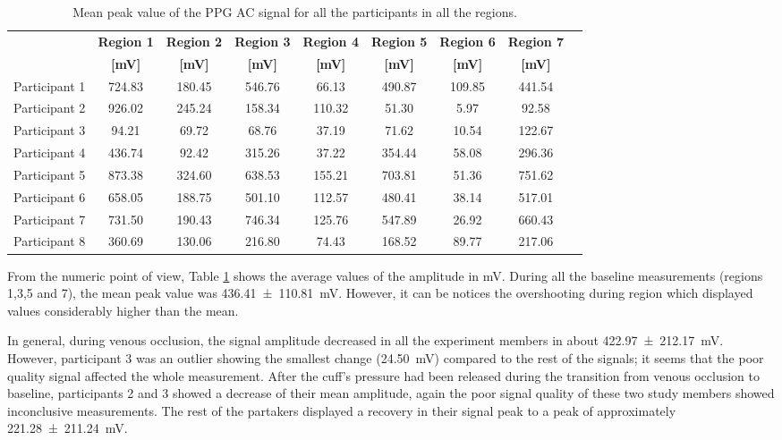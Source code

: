 \begin{table}[!htbp]
	\caption[Mean peak value of the PPG AC signal for all participants in all regions]{Mean peak value of the PPG AC signal for all the participants in all the regions.}
	\label{tbl:PPG RED-AC}
	\centering \small
	\begin{tabular}{lcccccccc}
		\toprule
		& \textbf{Region 1}
		& \textbf{Region 2}
		& \textbf{Region 3}
		& \textbf{Region 4}
		& \textbf{Region 5}
		& \textbf{Region 6}
		& \textbf{Region 7} \\
		& \textbf{[\si{\milli\volt}]}
		& \textbf{[\si{\milli\volt}]}
		& \textbf{[\si{\milli\volt}]}		
		& \textbf{[\si{\milli\volt}]}		
		& \textbf{[\si{\milli\volt}]}
		& \textbf{[\si{\milli\volt}]}
		& \textbf{[\si{\milli\volt}]}\\\midrule
		Participant 1 & 724.83 & 180.45 & 546.76 &  66.13 & 490.87 & 109.85 & 441.54   \\  
		Participant 2 & 926.02 & 245.24 & 158.34 & 110.32 &  51.30 &   5.97 &  92.58   \\  
		Participant 3 &  94.21 &  69.72 &  68.76 &  37.19 &  71.62 &  10.54 & 122.67   \\  
		Participant 4 & 436.74 &  92.42 & 315.26 &  37.22 & 354.44 &  58.08 & 296.36   \\  
		Participant 5 & 873.38 & 324.60 & 638.53 & 155.21 & 703.81 &  51.36 & 751.62   \\  
		Participant 6 & 658.05 & 188.75 & 501.10 & 112.57 & 480.41 &  38.14 & 517.01   \\  
		Participant 7 & 731.50 & 190.43 & 746.34 & 125.76 & 547.89 &  26.92 & 660.43   \\  
		Participant 8 & 360.69 & 130.06 & 216.80 &  74.43 & 168.52 &  89.77 & 217.06   \\ 
		\bottomrule
	\end{tabular}
\end{table}

From the numeric point of view, Table \ref{tbl:PPG RED-AC} shows the average values of the amplitude in \si{\milli\volt}. During all the baseline measurements (regions 1,3,5 and 7), the mean peak value was \SI{436.41(11081)}{\milli\volt}. However, it can be notices the overshooting during region which displayed values considerably higher than the mean.  

In general, during venous occlusion, the signal amplitude decreased in all the experiment members in about \SI{422.97(21217)}{\milli\volt}. However, participant 3 was an outlier showing the smallest change (\SI{24.50}{\milli\volt}) compared to the rest of the signals; it seems that the poor quality signal affected the whole measurement. After the cuff's pressure had been released during the transition from venous occlusion to baseline, participants 2 and 3 showed a decrease of their mean amplitude, again the poor signal quality of these two study members showed inconclusive measurements. The rest of the partakers displayed a recovery in their signal peak to a peak of approximately \SI{221.28(21124)}{\milli\volt}. 

